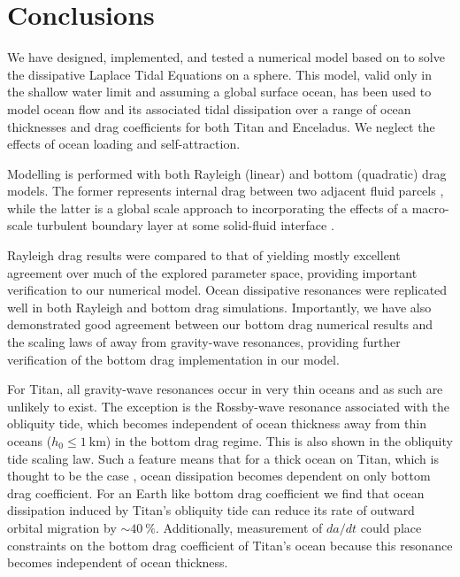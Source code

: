 \section{Conclusions}

We have designed, implemented, and tested a numerical model based on \citet{sears1995tidal} to solve the dissipative Laplace Tidal Equations on a sphere. This model, valid only in the shallow water limit and assuming a global surface ocean, has been used to model ocean flow and its associated tidal dissipation over a range of ocean thicknesses and drag coefficients for both Titan and Enceladus. We neglect the effects of ocean loading and self-attraction.

Modelling is performed with both Rayleigh (linear) and bottom (quadratic) drag models. The former represents internal drag between two adjacent fluid parcels \citep{neumann1968ocean}, while the latter is a global scale approach to incorporating the effects of a macro-scale turbulent boundary layer at some solid-fluid interface \citep{gill1982atmosphere}.

Rayleigh drag results were compared to that of \citet{matsuyama2014tidal} yielding mostly excellent agreement over much of the explored parameter space, providing important verification to our numerical model. Ocean dissipative resonances were replicated well in both Rayleigh and bottom drag simulations. Importantly, we have also demonstrated good agreement between our bottom drag numerical results and the scaling laws of \citet{chen2013tidal} away from gravity-wave resonances, providing further verification of the bottom drag implementation in our model.

For Titan, all gravity-wave resonances occur in very thin oceans and as such  are unlikely to exist. The exception is the Rossby-wave resonance associated with the obliquity tide, which becomes independent of ocean thickness away from thin oceans ($h_0 \leqslant\SI{1}{\kilo\metre}$) in the bottom drag regime. This is also shown in the \citet{chen2013tidal} obliquity tide scaling law. Such a feature means that for a thick ocean on Titan, which is thought to be the case \citep{sohl2014structural}, ocean dissipation becomes dependent on only bottom drag coefficient. For an Earth like bottom drag coefficient we find that ocean dissipation induced by Titan's obliquity tide can reduce its rate of outward orbital migration by  $\sim\SI{40}{\percent}$. Additionally, measurement of $da/dt$ could place constraints on the bottom drag coefficient of Titan's ocean because this resonance becomes independent of ocean thickness. 

